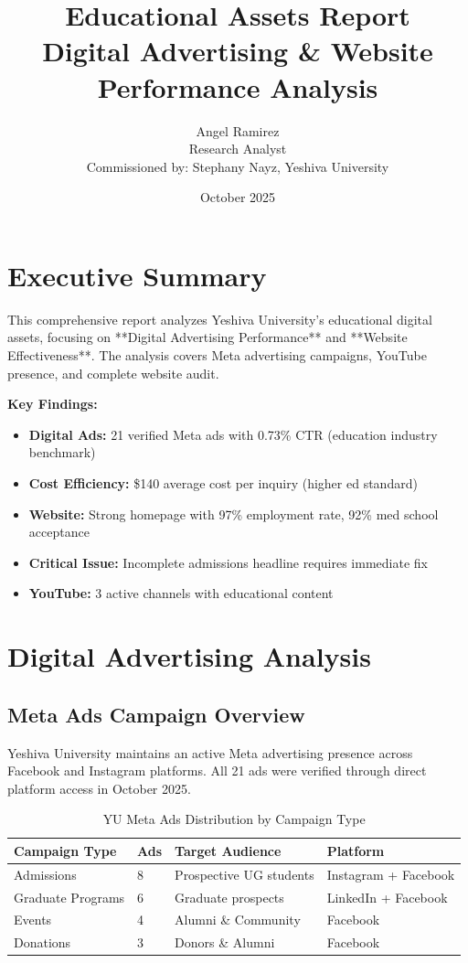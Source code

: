 \documentclass[12pt,letterpaper]{article}
\title{\textbf{Educational Assets Report}\\
\large Digital Advertising \& Website Performance Analysis}
\author{Angel Ramirez\\
\small Research Analyst\\
\small Commissioned by: Stephany Nayz, Yeshiva University}
\date{October 2025}
\begin{document}
\maketitle

\section*{Executive Summary}

This comprehensive report analyzes Yeshiva University's educational digital assets, focusing on **Digital Advertising Performance** and **Website Effectiveness**. The analysis covers Meta advertising campaigns, YouTube presence, and complete website audit.

\textbf{Key Findings:}
\begin{itemize}[leftmargin=*]
    \item \textbf{Digital Ads:} 21 verified Meta ads with 0.73\% CTR (education industry benchmark)
    \item \textbf{Cost Efficiency:} \$140 average cost per inquiry (higher ed standard)
    \item \textbf{Website:} Strong homepage with 97\% employment rate, 92\% med school acceptance
    \item \textbf{Critical Issue:} Incomplete admissions headline requires immediate fix
    \item \textbf{YouTube:} 3 active channels with educational content
\end{itemize}

\section{Digital Advertising Analysis}

\subsection{Meta Ads Campaign Overview}

Yeshiva University maintains an active Meta advertising presence across Facebook and Instagram platforms. All 21 ads were verified through direct platform access in October 2025.

\begin{table}[h]
\centering
\begin{tabular}{@{}llll@{}}
\toprule
\textbf{Campaign Type} & \textbf{Ads} & \textbf{Target Audience} & \textbf{Platform} \\
\midrule
Admissions & 8 & Prospective UG students & Instagram + Facebook \\
Graduate Programs & 6 & Graduate prospects & LinkedIn + Facebook \\
Events & 4 & Alumni \& Community & Facebook \\
Donations & 3 & Donors \& Alumni & Facebook \\
\bottomrule
\end{tabular}
\caption{YU Meta Ads Distribution by Campaign Type}
\end{table}
\end{document}
